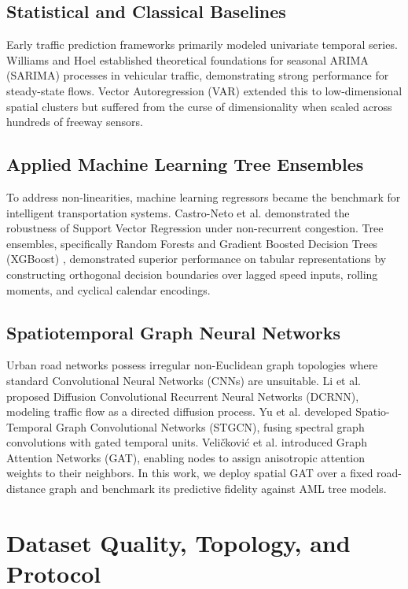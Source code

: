 \documentclass[conference]{IEEEtran}
\begin{document}
\subsection{Statistical and Classical Baselines}
Early traffic prediction frameworks primarily modeled univariate temporal series. Williams and Hoel \cite{williams2003arima} established theoretical foundations for seasonal ARIMA (SARIMA) processes in vehicular traffic, demonstrating strong performance for steady-state flows. Vector Autoregression (VAR) extended this to low-dimensional spatial clusters but suffered from the curse of dimensionality when scaled across hundreds of freeway sensors.

\subsection{Applied Machine Learning Tree Ensembles}
To address non-linearities, machine learning regressors became the benchmark for intelligent transportation systems. Castro-Neto et al. \cite{castro2009svr} demonstrated the robustness of Support Vector Regression under non-recurrent congestion. Tree ensembles, specifically Random Forests \cite{breiman2001random} and Gradient Boosted Decision Trees (XGBoost) \cite{chen2016xgboost}, demonstrated superior performance on tabular representations by constructing orthogonal decision boundaries over lagged speed inputs, rolling moments, and cyclical calendar encodings.

\subsection{Spatiotemporal Graph Neural Networks}
Urban road networks possess irregular non-Euclidean graph topologies where standard Convolutional Neural Networks (CNNs) are unsuitable. Li et al. \cite{li2018dcrnn} proposed Diffusion Convolutional Recurrent Neural Networks (DCRNN), modeling traffic flow as a directed diffusion process. Yu et al. \cite{yu2018stgcn} developed Spatio-Temporal Graph Convolutional Networks (STGCN), fusing spectral graph convolutions with gated temporal units. Veli\v{c}kovi\'{c} et al. \cite{velickovic2018gat} introduced Graph Attention Networks (GAT), enabling nodes to assign anisotropic attention weights to their neighbors. In this work, we deploy spatial GAT over a fixed road-distance graph and benchmark its predictive fidelity against AML tree models.

\section{Dataset Quality, Topology, and Protocol}
\end{document}
